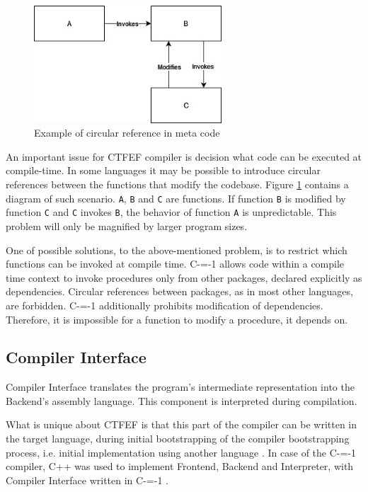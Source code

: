 \begin{figure}
	\includegraphics[width=7cm]{pictures/circular-function-reference.jpg}
	\caption{Example of circular reference in meta code}
	\label{circular-function-reference}
\end{figure}

An important issue for CTFEF compiler is decision what code can be executed at compile-time.
In some languages it may be possible to introduce circular references between the functions that modify the codebase.
Figure \ref{circular-function-reference} contains a diagram of such scenario.
\lstinline{A}, \lstinline{B} and \lstinline{C} are functions.
If function \lstinline{B} is modified by function \lstinline{C} and \lstinline{C} invokes \lstinline{B}, the behavior of function \lstinline{A} is unpredictable.
This problem will only be magnified by larger program sizes.

One of possible solutions, to the above-mentioned problem, is to restrict which functions can be invoked at compile time.
C-=-1 allows code within a compile time context to invoke procedures only from other packages, declared explicitly as dependencies.
Circular references between packages, as in most other languages, are forbidden.
C-=-1 additionally  prohibits modification of dependencies.
Therefore, it is impossible for a function to modify a procedure, it depends on.

\subsection{Compiler Interface}
\label{compiler-interface}

Compiler Interface translates the program's intermediate representation into the Backend's assembly language.
This component is interpreted during compilation.

What is unique about CTFEF is that this part of the compiler can be written in the target language, during initial bootstrapping of the compiler bootstrapping process, i.e. initial implementation using another language \cite{puntambekar:compiler_design, novillo2007gcc}.
In case of the C-=-1 compiler, C++ was used to implement Frontend, Backend and Interpreter, with Compiler Interface written in C-=-1 \cite{grabski2022compilation}.


